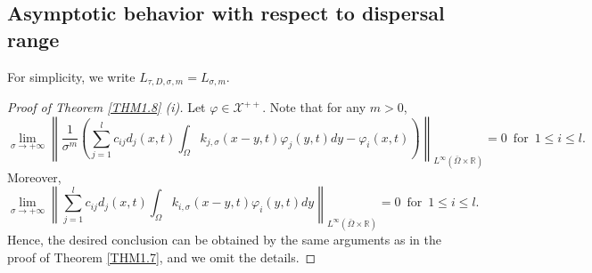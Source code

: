\documentclass[11pt,reqno]{amsart}
\numberwithin{equation}{section}
\begin{document}
\subsection{Asymptotic behavior with respect to dispersal range}
\indent

For simplicity, we write $L_{\tau,D,\sigma,m} = L_{\sigma,m}$.
\begin{proof}[Proof of Theorem \ref{THM1.8} (i)]
Let $\varphi\in \mathcal{X}^{++}$. Note that for any $m>0$,
\begin{equation*}
\lim_{\sigma \to +\infty}
\left\| \frac{1}{\sigma^{m}} \left( \sum_{j=1}^{l}  c_{ij}d_{j}(x,t) \int_{\Omega} k_{j,\sigma}(x-y,t)\varphi_{j}(y,t)dy - \varphi_{i}(x,t) \right) \right\|_{L^{\infty}(\bar{\Omega}\times \mathbb{R})} = 0
\enspace \text{for} \enspace
1 \leq i\leq l.
\end{equation*}
Moreover,
\begin{equation*}
\lim_{\sigma \to +\infty}
\left\|
\sum_{j=1}^{l}  c_{ij}d_{j}(x,t) \int_{\Omega} k_{i,\sigma}(x-y,t)\varphi_{i}(y,t)dy
\right\|_{L^{\infty}(\bar{\Omega}\times \mathbb{R})}  =0
\enspace \text{for} \enspace
1 \leq i\leq l.
\end{equation*}
Hence, the desired conclusion can be obtained by the same arguments as in the proof of Theorem \ref{THM1.7}, and we omit the details.
\end{proof}
\end{document}
